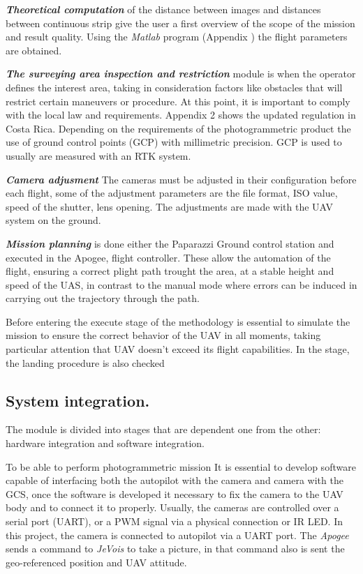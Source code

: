 \textit{\textbf{Theoretical computation}} of the distance between images and distances between continuous strip give the user a first overview of the scope of the mission and result quality. Using the \textit{Matlab} program (Appendix )  the flight parameters are obtained.

\textit{\textbf{The surveying area inspection and restriction}} module is when the operator defines the interest area, taking in consideration factors like obstacles that will restrict certain maneuvers or procedure. At this point, it is important to comply with the local law and requirements. Appendix 2 shows the updated regulation in Costa Rica. Depending on the requirements of the photogrammetric product the use of ground control points (GCP) with millimetric precision. GCP is used to usually are measured with an RTK system.

\textit{\textbf{Camera adjusment}}\newline
The cameras must be adjusted in their configuration before each flight, some of the adjustment parameters are the file format, ISO value, speed of the shutter, lens opening. The adjustments are made with the UAV system on the ground.

\textit{\textbf{Mission planning}} is done either the Paparazzi Ground control station and executed in the Apogee, flight controller. These allow the automation of the flight, ensuring a correct plight path trought the area, at a stable height and speed of the UAS, in contrast to the manual mode where errors can be induced in carrying out the trajectory through the path. 

Before entering the execute stage of the methodology is essential to simulate the mission to ensure the correct behavior of the UAV in all moments, taking particular attention that UAV doesn't exceed its flight capabilities. In the stage, the landing procedure is also checked
\subsection{System integration.}
The module is divided into stages that are dependent one from the other: hardware integration and software integration.

To be able to perform photogrammetric mission It is essential to develop software capable of interfacing both the autopilot with the camera and camera with the GCS, once the software is developed it necessary to fix the camera to the UAV body and to connect it to properly. Usually, the cameras are controlled over a serial port (UART), or a PWM signal via a physical connection or IR LED. In this project, the camera is connected to autopilot via a UART port. The \textit{Apogee} sends a command to \textit{JeVois} to take a picture,  in that command also is sent the geo-referenced position and UAV attitude.


